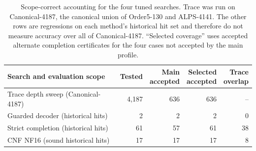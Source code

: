 \begin{table}[t]
\caption{Scope-correct accounting for the four tuned searches.  Trace was run
on Canonical-4187, the canonical union of Order5-130 and ALPS-4141.  The other rows are regressions on each
method's historical hit set and therefore do not measure accuracy over all of
Canonical-4187.  ``Selected coverage'' uses accepted alternate completion
certificates for the four cases not accepted by the main profile.}
\label{tab:isolated-results}
\centering
\footnotesize
\setlength{\tabcolsep}{4pt}
\renewcommand{\arraystretch}{1.08}
\begin{tabular}{@{}lrrrr@{}}
\toprule
Search and evaluation scope & Tested & \shortstack{Main\\accepted} &
\shortstack{Selected\\accepted} & \shortstack{Trace\\overlap} \\
\midrule
Trace depth sweep (Canonical-4187) & 4,187 & 636 & 636 & -- \\
Guarded decoder (historical hits) & 2 & 2 & 2 & 0 \\
Strict completion (historical hits) & 61 & 57 & 61 & 38 \\
CNF NF16 (sound historical hits) & 17 & 17 & 17 & 8 \\
\bottomrule
\end{tabular}
\end{table}
